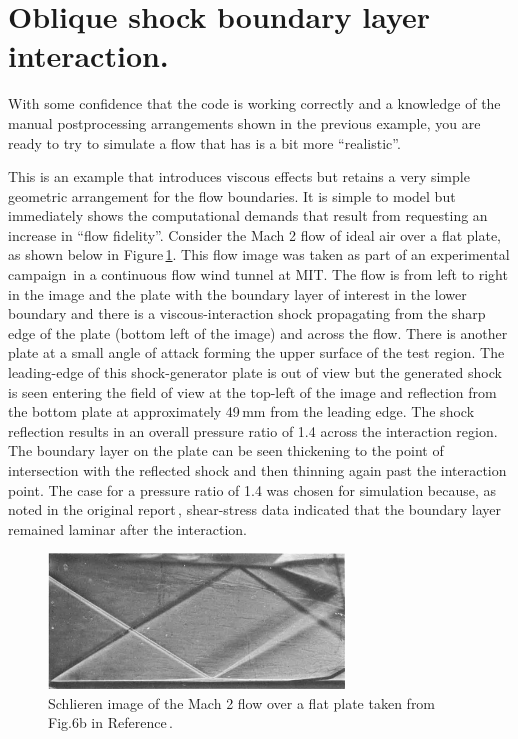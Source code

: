 
\section{Oblique shock boundary layer interaction.}
\label{sec:hakkinen-swlbli}
%
With some confidence that the code is working correctly and a knowledge of the 
manual postprocessing arrangements shown in the previous example,
you are ready to try to simulate a flow that has is a bit more ``realistic''.

\medskip
This is an example that introduces viscous effects but retains a very simple
geometric arrangement for the flow boundaries.
It is simple to model but immediately shows the computational demands that result
from requesting an increase in ``flow fidelity''.
Consider the Mach 2 flow of ideal air over a flat plate, 
as shown below in Figure\,\ref{fig:hakkinen-fig6b-schlieren}.
This flow image was taken as part of an experimental campaign\,\cite{hakkinen_etal_59} 
in a continuous flow wind tunnel at MIT.
The flow is from left to right in the image and the plate with the boundary layer of interest
in the lower boundary and there is a viscous-interaction shock propagating from the sharp
edge of the plate (bottom left of the image) and across the flow.
There is another plate at a small angle of attack forming the upper surface
of the test region.
The leading-edge of this shock-generator plate is out of view
but the generated shock is seen entering the field of view at the top-left of the image
and reflection from the bottom plate at approximately 49\,mm from the leading edge.
The shock reflection results in an overall pressure ratio of 1.4 across the interaction region.
The boundary layer on the plate can be seen thickening to the point of intersection with the
reflected shock and then thinning again past the interaction point.
The case for a pressure ratio of 1.4 was chosen for simulation because, as noted in the original
report\,\cite{hakkinen_etal_59}, shear-stress data indicated that the boundary layer remained laminar
after the interaction.

\begin{figure}[htbp]
 \centering
 \includegraphics[width=0.7\textwidth]{../2D/hakkinen-SWLBLI/notes/fig6b-schlieren.jpeg}
 \caption{Schlieren image of the Mach 2 flow over a flat plate taken 
          from Fig.6b in Reference\,\cite{hakkinen_etal_59}.}
 \label{fig:hakkinen-fig6b-schlieren}
\end{figure}

